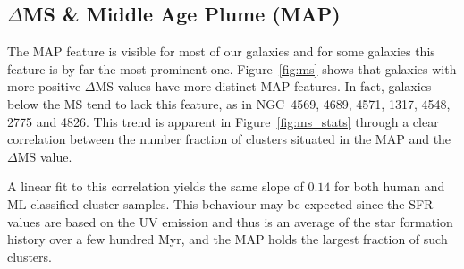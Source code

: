 \documentclass[linenumbers]{aastex63}
\begin{document}


\subsection{$\Delta$MS \& Middle Age Plume (MAP)}\label{sec:map}
The MAP feature is visible for most of our galaxies and for some galaxies this feature is by far the most prominent one. 
Figure~\ref{fig:ms} shows that galaxies with more positive $\Delta$MS values have more distinct MAP features. In fact, galaxies below the MS tend to lack this feature, as in NGC~4569, 4689, 4571, 1317, 4548, 2775 and 4826. 
This trend is apparent in Figure~\ref{fig:ms_stats} through a clear correlation between the number fraction of clusters situated in the MAP and the $\Delta$MS value. 

A linear fit to this correlation yields the same slope of $0.14$ for both human and ML classified cluster samples. This behaviour may be expected since the SFR values are based on the UV emission and thus is an average of the star formation history over a few hundred Myr, and the MAP holds the largest fraction of such clusters. 
\end{document}
